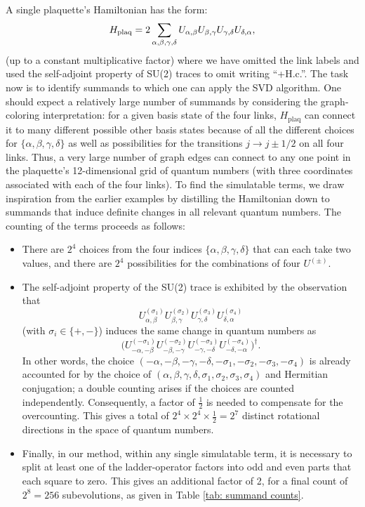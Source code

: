 \documentclass[aps,prd,twocolumn,showpacs,groupedaddress,superscriptaddress,nofootinbib,floatfix,preprintnumbers,longbibliography]{revtex4-1}
\begin{document}
A single plaquette's Hamiltonian has the form:
%
\begin{align}
    H_{\rm plaq}=
    2 \sum_{\alpha,\beta,\gamma, \delta} U_{\alpha,\beta} U_{\beta,\gamma} U_{\gamma,\delta} U_{\delta,\alpha},
\end{align}
%
(up to a constant multiplicative factor) where we have omitted the link labels and used the self-adjoint property of SU(2) traces to omit writing ``+H.c.''.
The task now is to identify summands to which one can apply the SVD algorithm.
One should expect a relatively large number of summands by considering the graph-coloring interpretation: for a given basis state of the four links, $H_{\mathrm{plaq}}$ can connect it to many different possible other basis states because of all the different choices for $\{\alpha,\beta,\gamma,\delta\}$ as well as possibilities for the transitions $j\to j\pm1/2$ on all four links.
Thus, a very large number of graph edges can connect to any one point in the plaquette's 12-dimensional grid of quantum numbers (with three coordinates associated with each of the four links).
To find the simulatable terms, we draw inspiration from the earlier examples by distilling the Hamiltonian down to summands that induce definite changes in all relevant quantum numbers. The counting of the terms proceeds as follows:
%
\begin{itemize}
    \item[$\diamond$] There are $2^4$ choices from the four indices $\{ \alpha,\beta,\gamma,\delta \}$ that can each take two values, and there are $2^4$ possibilities for the combinations of four $U^{(\pm)}$.
    \item[$\diamond$] The self-adjoint property of the SU(2) trace is exhibited by the observation that $$ U^{(\sigma_1)}_{\alpha,\beta} 
    U^{(\sigma_2)}_{\beta,\gamma} 
    U^{(\sigma_3)}_{\gamma,\delta} 
    U^{(\sigma_4)}_{\delta,\alpha} $$ (with $\sigma_i \in \{+,-\}$) induces the same change in quantum numbers as $$\bigl( U^{(-\sigma_1)}_{-{\alpha},-{\beta}} 
    U^{(-\sigma_2)}_{-{\beta},-{\gamma}} 
    U^{(-\sigma_3)}_{-{\gamma},-{\delta}} 
    U^{(-\sigma_4)}_{-{\delta},-{\alpha}} \bigr)^\dagger .$$ 
    In other words, the choice $(-{\alpha},-{\beta},-{\gamma},-{\delta},-\sigma_1,-\sigma_2 , - \sigma_3 , -\sigma_4 )$ is already accounted for by the choice of $(\alpha,\beta,\gamma,\delta,\sigma_1,\sigma_2,\sigma_3,\sigma_4)$ and Hermitian conjugation; a double counting arises if the choices are counted independently.
    Consequently, a factor of $\frac{1}{2}$ is needed to compensate for the overcounting. This gives a total of $2^4 \times 2^4 \times \tfrac{1}{2} = 2^7$ distinct rotational directions in the space of quantum numbers.
    \item[$\diamond$] Finally, in our method, within any single simulatable term, it is necessary to split at least one of the ladder-operator factors into odd and even parts that each square to zero.
    This gives an additional factor of 2, for a final count of $2^8=256$ subevolutions, as given in Table \ref{tab: summand counts}.
\end{itemize}
%
\end{document}
